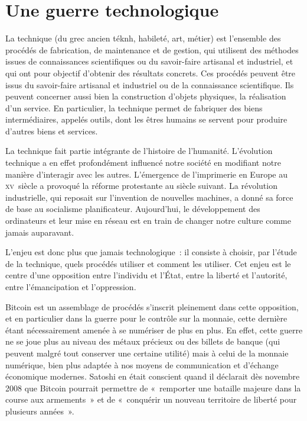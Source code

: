 
\chapter{Une guerre technologique}
\label{ch:cypherpunks}

La technique (du grec ancien \foreignlanguage{greek}{téknh}, habileté, art, métier) est l'ensemble des procédés de fabrication, de maintenance et de gestion, qui utilisent des méthodes issues de connaissances scientifiques ou du savoir-faire artisanal et industriel, et qui ont pour objectif d'obtenir des résultats concrets. Ces procédés peuvent être issus du savoir-faire artisanal et industriel ou de la connaissance scientifique. Ils peuvent concerner aussi bien la construction d'objets physiques, la réalisation d'un service. En particulier, la technique permet de fabriquer des biens intermédiaires, appelés outils, dont les êtres humains se servent pour produire d'autres biens et services.

La technique fait partie intégrante de l'histoire de l'humanité. L'évolution technique a en effet profondément influencé notre société en modifiant notre manière d'interagir avec les autres. L'émergence de l'imprimerie en Europe au \textsc{xv}\ieme{}~siècle a provoqué la réforme protestante au siècle suivant. La révolution industrielle, qui reposait sur l'invention de nouvelles machines, a donné sa force de base au socialisme planificateur. Aujourd'hui, le développement des ordinateurs et leur mise en réseau est en train de changer notre culture comme jamais auparavant.

L'enjeu est donc plus que jamais technologique~: il consiste à choisir, par l'étude de la technique, quels procédés utiliser et comment les utiliser. Cet enjeu est le centre d'une opposition entre l'individu et l'État, entre la liberté et l'autorité, entre l'émancipation et l'oppression.

Bitcoin est un assemblage de procédés s'inscrit pleinement dans cette opposition, et en particulier dans la guerre pour le contrôle sur la monnaie, cette dernière étant nécessairement amenée à se numériser de plus en plus. En effet, cette guerre ne se joue plus au niveau des métaux précieux ou des billets de banque (qui peuvent malgré tout conserver une certaine utilité) mais à celui de la monnaie numérique, bien plus adaptée à nos moyens de communication et d'échange économique modernes. Satoshi en était conscient quand il déclarait dès novembre 2008 que Bitcoin pourrait permettre de «~remporter une bataille majeure dans la course aux armements~» et de «~conquérir un nouveau territoire de liberté pour plusieurs années~».

